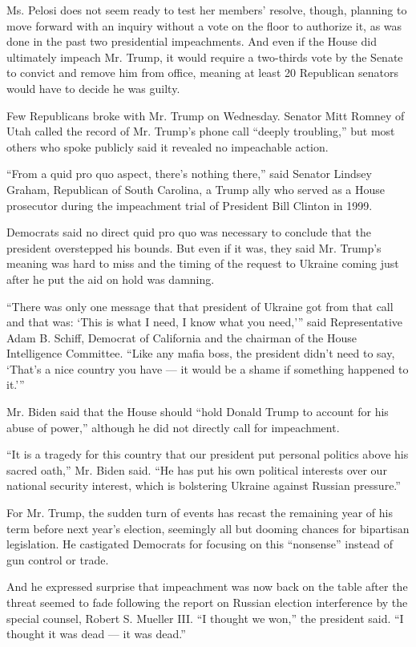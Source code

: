 Ms. Pelosi does not seem ready to test her members' resolve, though,
planning to move forward with an inquiry without a vote on the floor to
authorize it, as was done in the past two presidential impeachments. And
even if the House did ultimately impeach Mr. Trump, it would require a
two-thirds vote by the Senate to convict and remove him from office,
meaning at least 20 Republican senators would have to decide he was
guilty.

Few Republicans broke with Mr. Trump on Wednesday. Senator Mitt Romney
of Utah called the record of Mr. Trump's phone call ``deeply
troubling,'' but most others who spoke publicly said it revealed no
impeachable action.

``From a quid pro quo aspect, there's nothing there,'' said Senator
Lindsey Graham, Republican of South Carolina, a Trump ally who served as
a House prosecutor during the impeachment trial of President Bill
Clinton in 1999.

Democrats said no direct quid pro quo was necessary to conclude that the
president overstepped his bounds. But even if it was, they said Mr.
Trump's meaning was hard to miss and the timing of the request to
Ukraine coming just after he put the aid on hold was damning.

``There was only one message that that president of Ukraine got from
that call and that was: `This is what I need, I know what you need,'''
said Representative Adam B. Schiff, Democrat of California and the
chairman of the House Intelligence Committee. ``Like any mafia boss, the
president didn't need to say, `That's a nice country you have --- it
would be a shame if something happened to it.'''

Mr. Biden said that the House should ``hold Donald Trump to account for
his abuse of power,'' although he did not directly call for impeachment.

``It is a tragedy for this country that our president put personal
politics above his sacred oath,'' Mr. Biden said. ``He has put his own
political interests over our national security interest, which is
bolstering Ukraine against Russian pressure.''

For Mr. Trump, the sudden turn of events has recast the remaining year
of his term before next year's election, seemingly all but dooming
chances for bipartisan legislation. He castigated Democrats for focusing
on this ``nonsense'' instead of gun control or trade.

And he expressed surprise that impeachment was now back on the table
after the threat seemed to fade following the report on Russian election
interference by the special counsel, Robert S. Mueller III. ``I thought
we won,'' the president said. ``I thought it was dead --- it was dead.''

